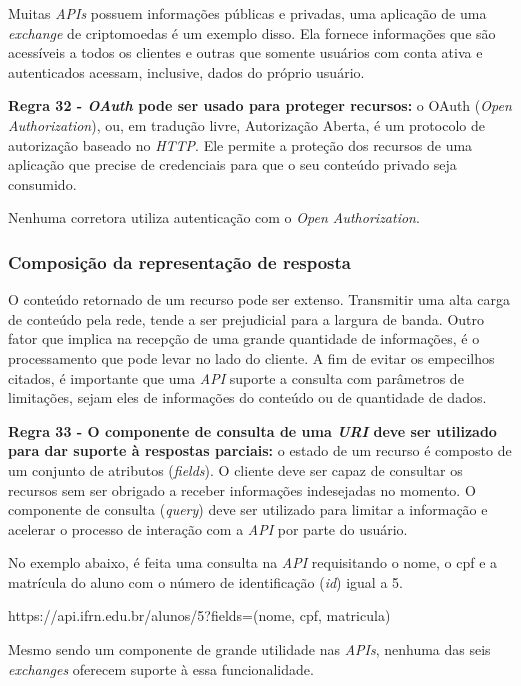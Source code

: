 Muitas \textit{APIs} possuem informações públicas e privadas, uma aplicação de uma \textit{exchange} de criptomoedas é um exemplo disso. Ela fornece informações que são acessíveis a todos os clientes e outras que somente usuários com conta ativa e autenticados acessam, inclusive, dados do próprio usuário.

\textbf{Regra 32 - \textit{OAuth} pode ser usado para proteger recursos:} o OAuth (\textit{Open Authorization}), ou, em tradução livre, Autorização Aberta, é um protocolo de autorização baseado no \textit{HTTP}. Ele permite a proteção dos recursos de uma aplicação que precise de credenciais para que o seu conteúdo privado seja consumido.

Nenhuma corretora utiliza autenticação com o \textit{Open Authorization}.

\subsubsection{Composição da representação de resposta}

O conteúdo retornado de um recurso pode ser extenso. Transmitir uma alta carga de conteúdo pela rede, tende a ser prejudicial para a largura de banda. Outro fator que implica na recepção de uma grande quantidade de informações, é o processamento que pode levar no lado do cliente. A fim de evitar os empecilhos citados, é importante que uma \textit{API} suporte a consulta com parâmetros de limitações, sejam eles de informações do conteúdo ou de quantidade de dados.

\textbf{Regra 33 - O componente de consulta de uma \textit{URI} deve ser utilizado para dar suporte à respostas parciais:} o estado de um recurso é composto de um conjunto de atributos (\textit{fields}). O cliente deve ser capaz de consultar os recursos sem ser obrigado a receber informações indesejadas no momento. O componente de consulta (\textit{query}) deve ser utilizado para limitar a informação e acelerar o processo de interação com a \textit{API} por parte do usuário.

No exemplo abaixo, é feita uma consulta na \textit{API} requisitando o nome, o cpf e a matrícula do aluno com o número de identificação (\textit{id}) igual a 5.

\centerline{https://api.ifrn.edu.br/alunos/5?fields=(nome, cpf, matricula)}

Mesmo sendo um componente de grande utilidade nas \textit{APIs}, nenhuma das seis \textit{exchanges} oferecem suporte à essa funcionalidade.

